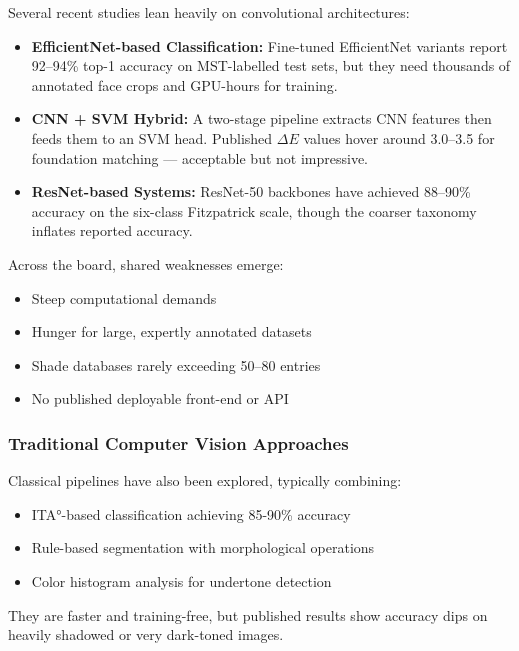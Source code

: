 Several recent studies lean heavily on convolutional architectures:

\begin{itemize}
    \item \textbf{EfficientNet-based Classification:} Fine-tuned EfficientNet variants report 92–94\% top-1 accuracy on MST-labelled test sets, but they need thousands of annotated face crops and GPU-hours for training.
    
    \item \textbf{CNN + SVM Hybrid:} A two-stage pipeline extracts CNN features then feeds them to an SVM head. Published $\Delta E$ values hover around 3.0–3.5 for foundation matching — acceptable but not impressive.
    
    \item \textbf{ResNet-based Systems:} ResNet-50 backbones have achieved 88–90\% accuracy on the six-class Fitzpatrick scale, though the coarser taxonomy inflates reported accuracy.
\end{itemize}

Across the board, shared weaknesses emerge:
\begin{itemize}
    \item Steep computational demands
    \item Hunger for large, expertly annotated datasets
    \item Shade databases rarely exceeding 50–80 entries
    \item No published deployable front-end or API
\end{itemize}

\subsubsection{Traditional Computer Vision Approaches}

Classical pipelines have also been explored, typically combining:

\begin{itemize}
    \item ITA°-based classification achieving 85-90\% accuracy
    \item Rule-based segmentation with morphological operations
    \item Color histogram analysis for undertone detection
\end{itemize}

They are faster and training-free, but published results show accuracy dips on heavily shadowed or very dark-toned images.

